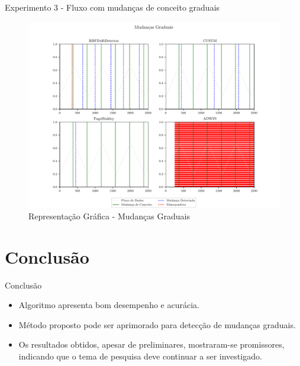 \documentclass[10pt]{beamer}
\begin{document}
\begin{frame}{Experimento 3 - Fluxo com mudanças de conceito graduais}
    \begin{figure}[ht]
        \begin{center}
            \includegraphics[scale=0.45]{../text/imagens/gradual.pdf}
            \caption{Representação Gráfica - Mudanças Graduais}
            \label{fig:exp_gradual}
        \end{center}
        \end{figure}
\end{frame}

\section{Conclusão}

\begin{frame}{Conclusão}
    \begin{itemize}
        \item<1 -> Algoritmo apresenta bom desempenho e acurácia.
        \item<2 -> Método proposto pode ser aprimorado para detecção de mudanças graduais.
        \item<3 -> Os resultados obtidos, apesar de preliminares, mostraram-se promissores, indicando que o tema de pesquisa deve continuar a ser investigado.
      \end{itemize}
\end{frame}
\end{document}
